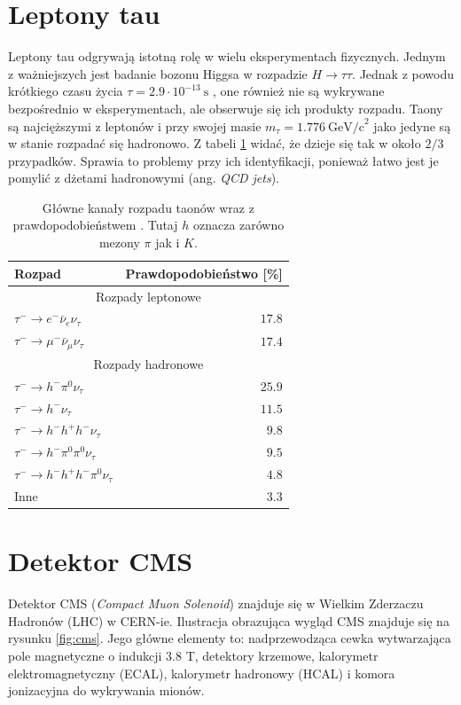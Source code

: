 \documentclass{pracalicmgr}
\begin{document}
    \section{Leptony tau}
    
    Leptony tau	odgrywają istotną rolę w wielu eksperymentach fizycznych. Jednym z ważniejszych jest badanie bozonu Higgsa w rozpadzie $H \rightarrow \tau\tau$. Jednak z powodu krótkiego czasu życia $\tau = 2.9 \cdot 10^{-13}~\mathrm{s}$ \cite{particle_physics}, one również nie są wykrywane bezpośrednio w eksperymentach, ale obserwuje się ich produkty rozpadu. Taony są najcięższymi z leptonów i przy swojej masie $m_\tau = 1.776 ~\mathrm{GeV/c}^2$ \cite{particle_physics} jako jedyne są w stanie rozpadać się hadronowo. Z tabeli \ref{tab:kanaly_rozpadu} widać, że dzieje się tak w około $2/3$ przypadków. Sprawia to problemy przy ich identyfikacji, ponieważ łatwo jest je pomylić z dżetami hadronowymi (ang. \textit{QCD jets}).
    
	\begin{table}[H]
	\centering
	\caption{Główne kanały rozpadu taonów wraz z prawdopodobieństwem \cite{tauid13, particle_physics}. Tutaj $h$ oznacza zarówno mezony $\pi$ jak i $K$.}
	\label{tab:kanaly_rozpadu}
	\begin{tabular}{lr}
	\toprule
	Rozpad & Prawdopodobieństwo [\%] \\
	\midrule
	\multicolumn{2}{c}{Rozpady leptonowe} \\
	\midrule
	$\tau^- \rightarrow e^-\bar{\nu}_{e}\nu_{\tau}$ & $17.8$ \\
	$\tau^- \rightarrow \mu^-\bar{\nu}_{\mu}\nu_{\tau}$ & $17.4$ \\
	\midrule
	\multicolumn{2}{c}{Rozpady hadronowe} \\
	\midrule
	$\tau^- \rightarrow h^- \pi^0 \nu_{\tau}$ & $25.9$ \\
	$\tau^- \rightarrow h^-\nu_{\tau}$ & $11.5$ \\
	$\tau^- \rightarrow h^- h^+ h^- \nu_{\tau}$ & $9.8$ \\
	$\tau^- \rightarrow h^- \pi^0 \pi^0 \nu_{\tau}$ & $9.5$ \\
	$\tau^- \rightarrow h^- h^+ h^- \pi^0 \nu_{\tau}$ & $4.8$ \\
	Inne & $3.3$ \\	
	\bottomrule
	\end{tabular}
	\end{table}
    \newpage
    \section{Detektor CMS}
	Detektor CMS (\textit{Compact Muon Solenoid}) znajduje się w Wielkim Zderzaczu Hadronów (LHC) \cite{adolphi2008cms} w CERN-ie. Ilustracja obrazująca wygląd CMS znajduje się na rysunku \ref{fig:cms}. Jego główne elementy to: nadprzewodząca cewka wytwarzająca pole magnetyczne o indukcji 3.8 T, detektory krzemowe, kalorymetr elektromagnetyczny (ECAL), kalorymetr hadronowy (HCAL) i komora jonizacyjna do wykrywania mionów. 
	
\end{document}
